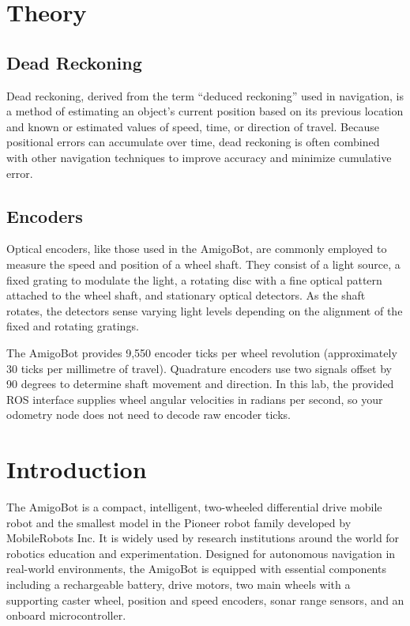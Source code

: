 \documentclass[12pt]{article}
\begin{document}
\newpage

\section{Theory}
\subsection*{Dead Reckoning}
Dead reckoning, derived from the term “deduced reckoning” used in navigation, is a method of estimating an object’s current position based on its previous location and known or estimated values of speed, time, or direction of travel. Because positional errors can accumulate over time, dead reckoning is often combined with other navigation techniques to improve accuracy and minimize cumulative error.




\subsection*{Encoders}
Optical encoders, like those used in the AmigoBot, are commonly employed to measure the speed and position of a wheel shaft. They consist of a light source, a fixed grating to modulate the light, a rotating disc with a fine optical pattern attached to the wheel shaft, and stationary optical detectors. As the shaft rotates, the detectors sense varying light levels depending on the alignment of the fixed and rotating gratings.

The AmigoBot provides 9,550 encoder ticks per wheel revolution (approximately 30 ticks per millimetre of travel). Quadrature encoders use two signals offset by 90 degrees to determine shaft movement and direction. In this lab, the provided ROS interface supplies wheel angular velocities in radians per second, so your odometry node does not need to decode raw encoder ticks.




\section{Introduction}
The AmigoBot is a compact, intelligent, two-wheeled differential drive mobile robot and the smallest model in the Pioneer robot family developed by MobileRobots Inc. It is widely used by research institutions around the world for robotics education and experimentation.
\noindent
Designed for autonomous navigation in real-world environments, the AmigoBot is equipped with essential components including a rechargeable battery, drive motors, two main wheels with a supporting caster wheel, position and speed encoders, sonar range sensors, and an onboard microcontroller.
\end{document}
